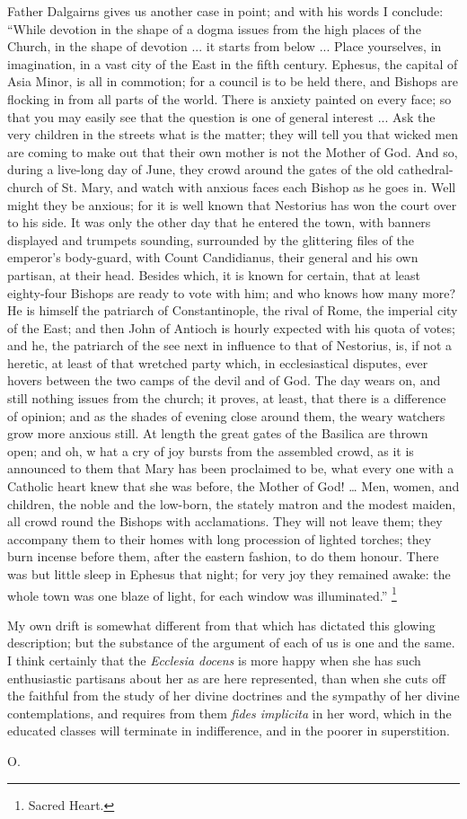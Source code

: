 Father Dalgairns gives us another case in point;
and with his words I conclude: ``While devotion in the shape of a dogma
issues from the high places of the Church, in the shape of devotion ...
it starts from below ... Place yourselves, in imagination, in a vast
city of the East in the fifth century. Ephesus, the capital of Asia
Minor, is all in commotion; for a council is to be held there, and
Bishops are flocking in from all parts of the world. There is anxiety
painted on every face; so that you may easily see that the question is
one of general interest ... Ask the very children in the streets what is
the matter; they will tell you that wicked men are coming to make out
that their own mother is not the Mother of God. And so, during a
live-long day of June, they crowd around the gates of the old
cathedral-church of St. Mary, and watch with anxious faces each Bishop
as he goes in. Well might they be anxious; for it is well known that
Nestorius has won the court over to his side. It was only the other day
that he entered the town, with banners displayed and trumpets sounding,
surrounded by the glittering files of the emperor's body-guard, with
Count Candidianus, their general and his own partisan, at their
head. Besides which, it is known for certain, that at least eighty-four
Bishops are ready to vote with him; and who knows how many more? He is
himself the patriarch of Constantinople, the rival of Rome, the imperial
city of the East; and then John of Antioch is hourly expected with his
quota of votes; and he, the patriarch of the see next in influence to
that of Nestorius, is, if not a heretic, at least of that wretched party
which, in ecclesiastical disputes, ever hovers between the two camps of
the devil and of God. The day wears on, and still nothing issues from
the church; it proves, at least, that there is a difference of opinion;
and as the shades of evening close around them, the weary watchers grow
more anxious still. At length the great gates of the Basilica are thrown
open; and oh, w hat a cry of joy bursts from the assembled crowd, as it
is announced to them that Mary has been proclaimed to be, what every one
with a Catholic heart knew that she was before, the Mother of God! …
Men, women, and children, the noble and the low-born, the stately matron
and the modest maiden, all crowd round the Bishops with acclamations.
They will not leave them; they accompany them to their homes with long
procession of lighted torches; they burn incense before them, after the
eastern fashion, to do them honour. There was but little sleep in
Ephesus that night; for very joy they remained awake: the whole town was
one blaze of light, for each window was illuminated.'' \footnote{Sacred Heart.}

My own drift is somewhat different from that which
has dictated this glowing description; but the substance of the argument
of each of us is one and the same. I think certainly that the \emph{Ecclesia
docens} is more happy when she has such enthusiastic partisans about
her as are here represented, than when she cuts off the faithful from
the study of her divine doctrines and the sympathy of her divine
contemplations, and requires from them \emph{fides implicita} in her
word, which in the educated classes will terminate in indifference, and
in the poorer in superstition.

O.
